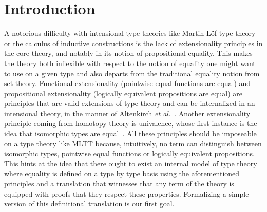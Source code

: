 \section{Introduction}
\label{sec:introduction}
A notorious difficulty with intensional type theories like Martin-Löf
type theory or the calculus of inductive constructions is the lack of
extensionality principles in the core theory, and notably in its notion
of propositional equality. This makes the theory both inflexible with
respect to the notion of equality one might want to use on a given type
and also departs from the traditional equality notion from set
theory. Functional extensionality (pointwise equal functions are equal)
and propositional extensionality (logically equivalent propositions are
equal) are principles that are valid extensions of type theory and can
be internalized in an intensional theory, in the manner of Altenkirch
\textit{et al.}~\cite{altenkirch-mcbride-wierstra:ott-now}.  Another
extensionality principle coming from homotopy theory is univalence,
whose first instance is the idea that isomorphic types are
equal~\cite{Voevodsky:2011yq,Pelayo:2012uq}. All these principles should
be imposeable on a type theory like MLTT because, intuitively, no term
can distinguish between isomorphic types, pointwise equal functions or
logically equivalent propositions.
%
This hints at the idea that there ought to exist an internal model of
type theory where equality is defined on a type by type basis using
the aforementioned principles and a translation that witnesses that
any term of the theory is equipped with proofs that they respect these
properties. Formalizing a simple version of this definitional
translation is our first goal.


